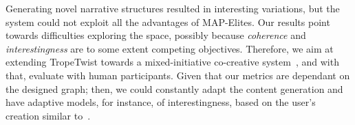 Generating novel narrative structures resulted in interesting variations, but the system could not exploit all the advantages of MAP-Elites. Our results point towards difficulties exploring the space, possibly because \emph{coherence} and \emph{interestingness} are to some extent competing objectives. Therefore, we aim at extending TropeTwist towards a mixed-initiative co-creative system~\cite{p12yannakakis2014micc}, and with that, evaluate with human participants. Given that our metrics are dependant on the designed graph; then, we could constantly adapt the content generation and have adaptive models, for instance, of interestingness, based on the user's creation similar to~\cite{p12alvarez2019empowering,Panagiotis2021-susketch}. 







